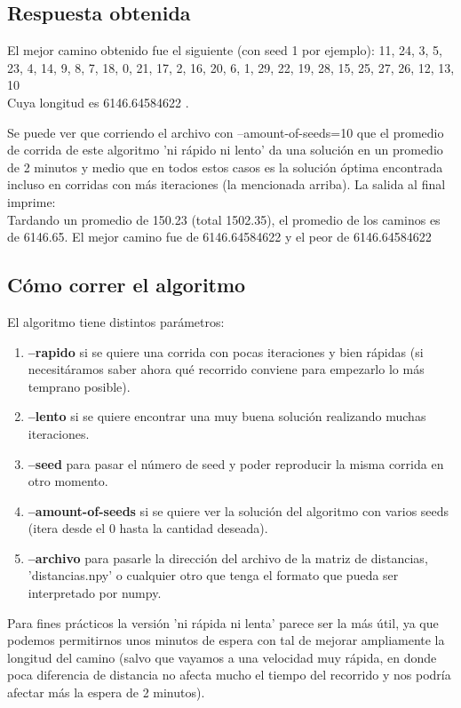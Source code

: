 \documentclass{article}
\begin{document}
\subsection{Respuesta obtenida}
El mejor camino obtenido fue el siguiente (con seed 1 por ejemplo): 11, 24, 3, 5, 23, 4, 14, 9, 8, 7, 18, 0, 21, 17, 2, 16, 20, 6, 1, 29, 22, 19, 28, 15, 25, 27, 26, 12, 13, 10
\\
Cuya longitud es 6146.64584622 .

Se puede ver que corriendo el archivo con --amount-of-seeds=10 que el promedio de corrida de este algoritmo 'ni rápido ni lento' da una solución en un promedio de 2 minutos y medio que en todos estos casos es la solución óptima encontrada incluso en corridas con más iteraciones (la mencionada arriba). La salida al final imprime:\\
Tardando un promedio de 150.23 (total 1502.35), el promedio de los caminos es de 6146.65. El mejor camino fue de 6146.64584622 y el peor de 6146.64584622

\subsection{Cómo correr el algoritmo}

El algoritmo tiene distintos parámetros:

\begin{enumerate}
    \item \textbf{--rapido} si se quiere una corrida con pocas iteraciones y bien rápidas (si necesitáramos saber ahora qué recorrido conviene para empezarlo lo más temprano posible).
    \item \textbf{--lento} si se quiere encontrar una muy buena solución realizando muchas iteraciones.
    \item \textbf{--seed} para pasar el número de seed y poder reproducir la misma corrida en otro momento.
    \item \textbf{--amount-of-seeds} si se quiere ver la solución del algoritmo con varios seeds (itera desde el 0 hasta la cantidad deseada).
    \item \textbf{--archivo} para pasarle la dirección del archivo de la matriz de distancias, 'distancias.npy' o cualquier otro que tenga el formato que pueda ser interpretado por numpy.
\end{enumerate}

Para fines prácticos la versión 'ni rápida ni lenta' parece ser la más útil, ya que podemos permitirnos unos minutos de espera con tal de mejorar ampliamente la longitud del camino (salvo que vayamos a una velocidad muy rápida, en donde poca diferencia de distancia no afecta mucho el tiempo del recorrido y nos podría afectar más la espera de 2 minutos).
\end{document}
